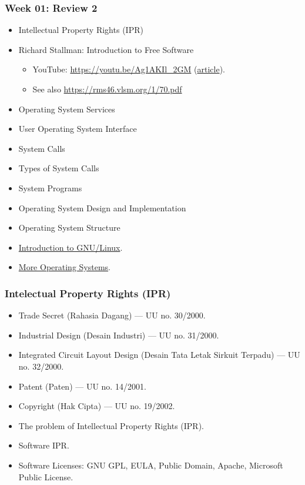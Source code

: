 \documentclass[aspectratio=169, xcolor=table, notheorems, hyperref={pdfpagelabels=false}]{beamer}
\begin{document}

\begin{frame}
\frametitle{Week 01: Review 2}

\begin{itemize}
\item Intellectual Property Rights (IPR)
\item Richard Stallman: Introduction to Free Software
\begin{itemize}
\item YouTube: \url{https://youtu.be/Ag1AKIl_2GM} 
      (\href{https://www.fsf.org/blogs/rms/20140407-geneva-tedx-talk-free-software-free-society}{article}).
\item See also \url{https://rms46.vlsm.org/1/70.pdf}
\end{itemize}
\item Operating System Services
\item User Operating System Interface
\item System Calls
\item Types of System Calls
\item System Programs
\item Operating System Design and Implementation
\item Operating System Structure
\item \href{https://osp4diss.vlsm.org/Welcome2GNULinux.html}{Introduction to GNU/Linux}.
\item \href{https://osp4diss.vlsm.org/osp-115.html}{More Operating Systems}.
\end{itemize}
\end{frame}

\begin{frame}
\frametitle{Intelectual Property Rights (IPR)}
\begin{itemize}
\item Trade Secret (Rahasia Dagang) --- UU no. 30/2000.
\item Industrial Design (Desain Industri) --- UU no. 31/2000.
\item Integrated Circuit Layout Design (Desain Tata Letak Sirkuit Terpadu) --- UU no. 32/2000.
\item Patent (Paten) --- UU no. 14/2001.
\item Copyright (Hak Cipta) --- UU no. 19/2002.
\item The problem of Intellectual Property Rights (IPR).
\item Software IPR.
\item Software Licenses: GNU GPL, EULA, Public Domain, Apache, Microsoft Public License.
\end{itemize}
\end{frame}
\end{document}
